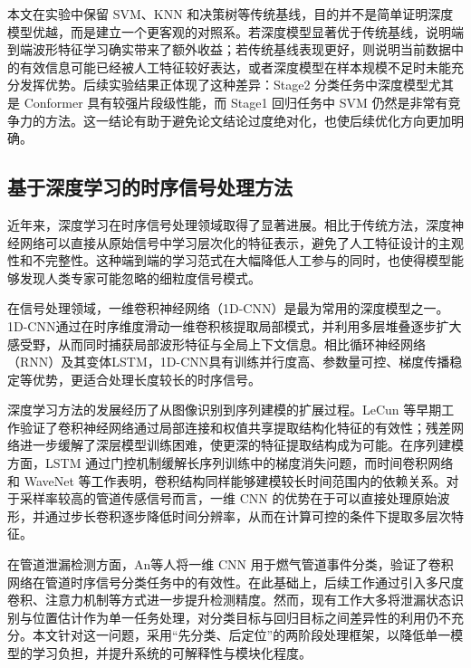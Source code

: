 本文在实验中保留 SVM、KNN 和决策树等传统基线，目的并不是简单证明深度模型优越，而是建立一个更客观的对照系。若深度模型显著优于传统基线，说明端到端波形特征学习确实带来了额外收益；若传统基线表现更好，则说明当前数据中的有效信息可能已经被人工特征较好表达，或者深度模型在样本规模不足时未能充分发挥优势。后续实验结果正体现了这种差异：Stage2 分类任务中深度模型尤其是 Conformer 具有较强片段级性能，而 Stage1 回归任务中 SVM 仍然是非常有竞争力的方法。这一结论有助于避免论文结论过度绝对化，也使后续优化方向更加明确。

\subsection{基于深度学习的时序信号处理方法}

近年来，深度学习在时序信号处理领域取得了显著进展。相比于传统方法，深度神经网络可以直接从原始信号中学习层次化的特征表示，避免了人工特征设计的主观性和不完整性\cite{goodfellow2016deep}。这种端到端的学习范式在大幅降低人工参与的同时，也使得模型能够发现人类专家可能忽略的细粒度信号模式。

在信号处理领域，一维卷积神经网络（1D-CNN）是最为常用的深度模型之一\cite{kiranyaz2021convolutional}。1D-CNN通过在时序维度滑动一维卷积核提取局部模式，并利用多层堆叠逐步扩大感受野，从而同时捕获局部波形特征与全局上下文信息。相比循环神经网络（RNN）及其变体LSTM，1D-CNN具有训练并行度高、参数量可控、梯度传播稳定等优势，更适合处理长度较长的时序信号\cite{wang2022deep}。

深度学习方法的发展经历了从图像识别到序列建模的扩展过程。LeCun 等早期工作验证了卷积神经网络通过局部连接和权值共享提取结构化特征的有效性\cite{lecun1998mnist}；残差网络进一步缓解了深层模型训练困难，使更深的特征提取结构成为可能\cite{he2016resnet}。在序列建模方面，LSTM 通过门控机制缓解长序列训练中的梯度消失问题\cite{hochreiter1997lstm}，而时间卷积网络和 WaveNet 等工作表明，卷积结构同样能够建模较长时间范围内的依赖关系\cite{bai2018tcn,oord2016wavenet}。对于采样率较高的管道传感信号而言，一维 CNN 的优势在于可以直接处理原始波形，并通过步长卷积逐步降低时间分辨率，从而在计算可控的条件下提取多层次特征。

在管道泄漏检测方面，An等人\cite{zhang2019cnn}将一维 CNN 用于燃气管道事件分类，验证了卷积网络在管道时序信号分类任务中的有效性。在此基础上，后续工作通过引入多尺度卷积\cite{hou2022multiscale}、注意力机制\cite{nguyen2021attention}等方式进一步提升检测精度。然而，现有工作大多将泄漏状态识别与位置估计作为单一任务处理，对分类目标与回归目标之间差异性的利用仍不充分。本文针对这一问题，采用“先分类、后定位”的两阶段处理框架，以降低单一模型的学习负担，并提升系统的可解释性与模块化程度。

